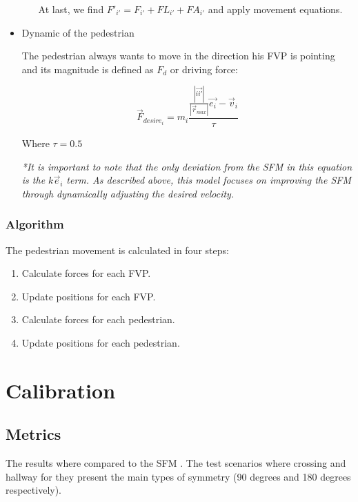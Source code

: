 \documentclass[draftclsnofoot]{IEEEtran}
\begin{document}
\begin{itemize}
\begin{itemize}
At last, we find $F'_{i'}=F_{i'}+FL_{i'}+FA_{i'}$ and apply movement
equations.

\end{itemize}
\item Dynamic of the pedestrian


The pedestrian always wants to move in the direction his FVP is pointing
and its magnitude is defined as $F_{d}$ or driving force:


\[
\vec{F}_{desire_{i}}=m_{i}\frac{\frac{|\vec{ii'}|}{|\vec{r}_{max}|}\vec{e_{i}}-\vec{v}_{i}}{\tau}
\]



Where $\tau=0.5$


\textit{{*}It is important to note that the only deviation from the
SFM in this equation is the $k\vec{e}_{i}$ term. As described above,
this model focuses on improving the SFM through dynamically adjusting
the desired velocity.}

\end{itemize}

\subsubsection{Algorithm}

The pedestrian movement is calculated in four steps: 
\begin{enumerate}
    \item Calculate forces for each FVP. 
    \item Update positions for each FVP. 
    \item Calculate forces for each pedestrian. 
    \item Update positions for each pedestrian. 
\end{enumerate}

\section{Calibration}


\subsection{Metrics}

The results where compared to the SFM \cite{key-helb2000}. The test scenarios
where crossing and hallway for they present the main types of symmetry
(90 degrees and 180 degrees respectively).
\end{document}
